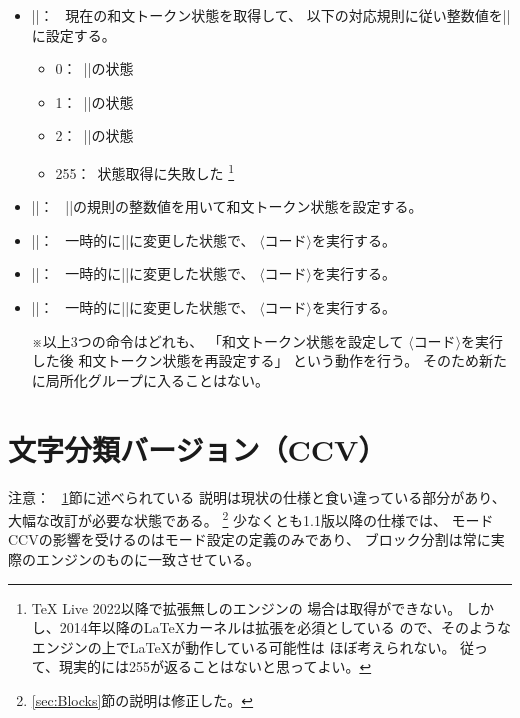 \documentclass[uplatex,dvipdfmx,a4paper]{jsarticle}
\newcommand{\Meta}[1]{%
  $\langle$\mbox{}\nolinebreak#1\nolinebreak\mbox{}$\rangle$}
\newcommand{\Note}{\par\noindent ※}
\newcommand{\Means}{：~}
\newcommand{\strong}{\textsf}
\begin{document}
\begin{itemize}

\item |\getcjktokenmode|\Means
  現在の和文トークン状態を取得して、
  以下の対応規則に従い整数値を|\thecjktokenmode|に設定する。
  \begin{itemize}
  \item 0\Means |\disablecjktoken|の状態
  \item 1\Means |\enablecjktoken|の状態
  \item 2\Means |\forcecjktoken|の状態
  \item 255\Means 状態取得に失敗した
  \footnote{{\TeX} Live 2022以降で{\eTeX}拡張無しの{\upTeX}エンジンの
    場合は取得ができない。
    しかし、2014年以降の{\LaTeX}カーネルは{\eTeX}拡張を必須としている
    ので、そのようなエンジンの上で{\LaTeX}が動作している可能性は
    ほぼ考えられない。
    従って、現実的には255が返ることはないと思ってよい。}
  \end{itemize}

\item |\setcjktokenmode{|\Meta{整数値}|}|\Means
  |\getcjktokenmode|の規則の整数値を用いて和文トークン状態を設定する。

\item |\withcjktokendisabled{|\Meta{コード}|}|\Means
  一時的に|\disablecjktoken|に変更した状態で、
  \Meta{コード}を実行する。
\item |\withcjktokenenabled{|\Meta{コード}|}|\Means
  一時的に|\enablecjktoken|に変更した状態で、
  \Meta{コード}を実行する。
\item |\withcjktokenforced{|\Meta{コード}|}|\Means
  一時的に|\forcecjktoken|に変更した状態で、
  \Meta{コード}を実行する。
\Note 以上3つの命令はどれも、
「和文トークン状態を設定して\Meta{コード}を実行した後
和文トークン状態を再設定する」
という動作を行う。
そのため新たに局所化グループに入ることはない。

\end{itemize}

\section{文字分類バージョン（CCV）}
\label{sec:CCV}

\noindent \strong{注意}\Means
\ref{sec:CCV}節に述べられている
説明は現状の仕様と食い違っている部分があり、
大幅な改訂が必要な状態である。
\footnote{\ref{sec:Blocks}節の説明は修正した。}%
少なくとも1.1版以降の仕様では、
モードCCVの影響を受けるのはモード設定の定義のみであり、
ブロック分割は常に実際のエンジンのものに一致させている。
\end{document}
